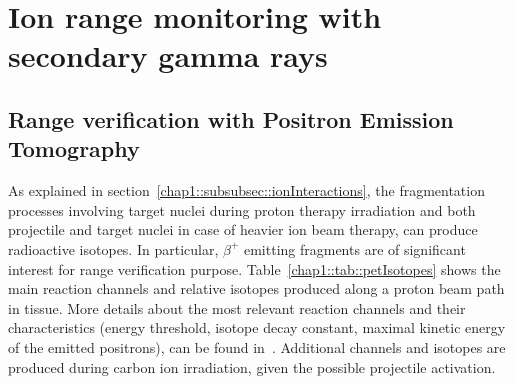 \section{Ion range monitoring with secondary gamma rays}\label{chap2::sec::GammaIonRange}

\subsection{Range verification with Positron Emission Tomography}\label{chap2::subsec::PETrangeVerif}

As explained in section~\ref{chap1::subsubsec::ionInteractions}, the fragmentation processes involving target nuclei during proton therapy irradiation and both projectile and target nuclei in case of heavier ion beam therapy, can produce radioactive isotopes. In particular, $\beta^+$ emitting fragments are of significant interest for range verification purpose. Table~\ref{chap1::tab::petIsotopes} shows the main reaction channels and relative isotopes produced along a proton beam path in tissue. More details about the most relevant reaction channels and their characteristics (energy threshold, isotope decay constant, maximal kinetic energy of the emitted positrons), can be found in~\cite{Oelfke1996}. Additional channels and isotopes are produced during carbon ion irradiation, given the possible projectile activation. 

\begin{table}[!htbp]
\centering
\caption{Proton-nuclear reaction channels and relative positron emitters produced in human tissues. Table reproduced from~\cite{Espana2011b}.}
\label{chap1::tab::petIsotopes}
\end{table}    

